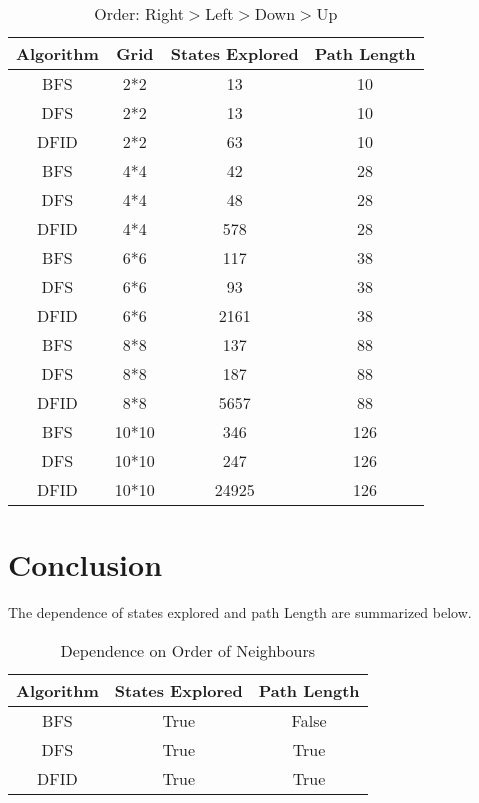 \documentclass{article}
\begin{document}
\begin{table}[H]
\begin{tabular}{|c|c|c|c|}
    \hline
    Algorithm & Grid & States Explored & Path Length \\
    \hline
    BFS &2*2 & 13 & 10 \\
    \hline
    DFS &2*2 & 13 & 10 \\
    \hline
    DFID &2*2 & 63 & 10 \\
    \hline
    BFS &4*4 & 42 & 28 \\
    \hline
    DFS &4*4 & 48 & 28 \\
    \hline
    DFID &4*4 & 578 & 28\\
    \hline
    BFS &6*6 & 117 & 38 \\
    \hline
    DFS &6*6 & 93 & 38\\
    \hline
    DFID &6*6 & 2161 & 38\\
    \hline
    BFS &8*8 & 137 & 88 \\
    \hline
    DFS &8*8 & 187 & 88\\
    \hline
    DFID &8*8 & 5657 & 88\\
    \hline
    BFS &10*10 & 346 & 126\\
    \hline
    DFS &10*10 & 247 & 126\\
    \hline
    DFID &10*10 & 24925 & 126 \\
    \hline
\end{tabular}
\caption{Order: Right$>$Left$>$Down$>$Up}
\end{table}

\section{Conclusion}

The dependence of states explored and path Length are summarized below.

\begin{table}[H]
    \caption{Dependence on Order of Neighbours}

\begin{tabular}{|c|c|c|}
    \hline
    Algorithm & States Explored  & Path Length \\
    \hline
    BFS & True & False \\
    \hline
    DFS & True & True \\
    \hline
    DFID & True & True \\
    \hline
\end{tabular}
\end{table}
\end{document}
